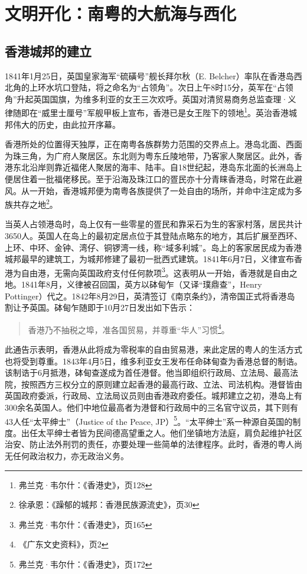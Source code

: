\chapter{文明开化：南粤的大航海与西化}

\section{香港城邦的建立}

\indent 1841年1月25日，英国皇家海军“硫磺号”舰长拜尔秋（E. Belcher）率队在香港岛西北角的上环水坑口登陆，将之命名为“占领角”。次日上午8时15分，英军在“占领角”升起英国国旗，为维多利亚的女王三次欢呼。英国对清贸易商务总监查理·义律随即在“威里士厘号”军舰甲板上宣布，香港已是女王陛下的领地\footnote{弗兰克·韦尔什：《香港史》，页128}。英治香港城邦伟大的历史，由此拉开序幕。

香港所处的位置得天独厚，正在南粤各族群势力范围的交界点上。港岛北面、西面为珠三角，为广府人聚居区。东北则为粤东丘陵地带，乃客家人聚居区。此外，香港东北沿岸则靠近福佬人聚居的海丰、陆丰。自18世纪起，港岛东北面的长洲岛上便居住着一批福佬移民。至于沿海及珠江口的疍民亦十分青睐香港岛，时常在此避风。从一开始，香港城邦便为南粤各族提供了一处自由的场所，并命中注定成为多族共存之地\footnote{徐承恩：《躁郁的城邦：香港民族源流史》，页30}。

当英人占领港岛时，岛上仅有一些零星的疍民和靠采石为生的客家村落，居民共计3650人。英国人在岛上的最初定居点位于其登陆点略东的地方，其后扩展至西环、上环、中环、金钟、湾仔、铜锣湾一线，称“域多利城”。岛上的客家居民成为香港城邦最早的建筑工，为城邦修建了最初一批西式建筑。1841年6月7日，义律宣布香港为自由港，无需向英国政府支付任何款项\footnote{弗兰克·韦尔什：《香港史》，页165}。这表明从一开始，香港就是自由之地。1841年8月，义律被召回国，英方以砵甸乍（又译“璞鼎查”，Henry Pottinger）代之。1842年8月29日，英清签订《南京条约》，清帝国正式将香港岛割让予英国。砵甸乍随即于10月27日发出如下告示：

\begin{quote}

香港乃不抽税之埠，准各国贸易，并尊重“华人”习惯\footnote{《广东文史资料》，页2}。

\end{quote}

此通告示表明，香港从此将成为零税率的自由贸易港，来此定居的粤人的生活方式也将受到尊重。1843年4月5日，维多利亚女王发布任命砵甸查为香港总督的制诰。该制诰于6月抵港，砵甸查遂成为首任港督。他当即组织行政局、立法局、最高法院，按照西方三权分立的原则建立起香港的最高行政、立法、司法机构。港督皆由英国政府委派，行政局、立法局议员则由香港政府委任。城邦建立之初，港岛上有300余名英国人。他们中地位最高者为港督和行政局中的三名官守议员，其下则有43人任“太平绅士”（Justice of the Peace, JP）\footnote{弗兰克·韦尔什：《香港史》，页172}。“太平绅士”系一种源自英国的制度。出任太平绅士者皆为民间德高望重之人。他们坐镇地方法庭，肩负起维护社区治安、防止法外刑罚的责任，亦要处理一些简单的法律程序。此时，香港的粤人尚无任何政治权力，亦无政治义务。

